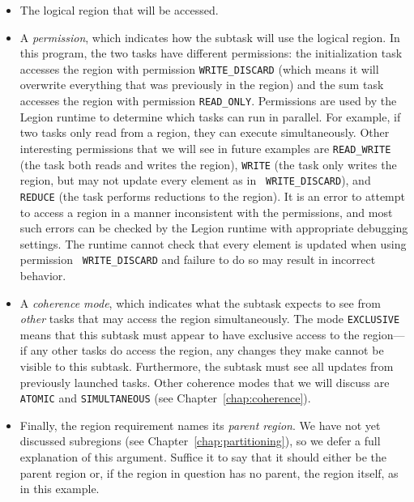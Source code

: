 \begin{itemize}

\item The logical region that will be accessed.

\item A {\em permission}, which indicates how the subtask will
  use the logical region.  In this program, the two tasks have
  different permissions: the initialization task accesses the region
  with permission {\tt WRITE\_DISCARD} (which means it will overwrite
  everything that was previously in the region) and the sum task
  accesses the region with permission {\tt READ\_ONLY}.  Permissions are
  used by the Legion runtime to determine which tasks can run in
  parallel.  For example, if two tasks only read from a region, they
  can execute simultaneously.  Other interesting permissions that we
  will see in future examples are {\tt READ\_WRITE} (the task both
  reads and writes the region), {\tt WRITE} (the task only writes the
  region, but may not update every element as in {\tt
    WRITE\_DISCARD}), and {\tt REDUCE} (the task performs reductions
  to the region).  It is an error to attempt to access a region in a
  manner inconsistent with the permissions, and most such errors can be
  checked by the Legion runtime with appropriate debugging settings.
  The runtime cannot check
  that every element is updated when using permission {\tt
    WRITE\_DISCARD} and failure to do so may result in incorrect
  behavior.

\item A {\em coherence mode}, which indicates what the subtask expects to see from {\em other} tasks that may access the
region simultaneously.  The mode {\tt EXCLUSIVE} means that this subtask must appear to have exclusive access to the region---if
any other tasks do access the region, any changes they make cannot be visible to this subtask. Furthermore, the subtask
must see all updates from previously launched tasks. Other coherence modes that we will discuss are {\tt ATOMIC} and
{\tt SIMULTANEOUS} (see Chapter~\ref{chap:coherence}).

\item Finally, the region requirement names its {\em parent region}.
  We have not yet discussed subregions (see
  Chapter~\ref{chap:partitioning}), so we defer a full explanation of
  this argument.  Suffice it to say that it should either be the
  parent region or, if the region in question has no parent, the
  region itself, as in this example.

\end{itemize}

